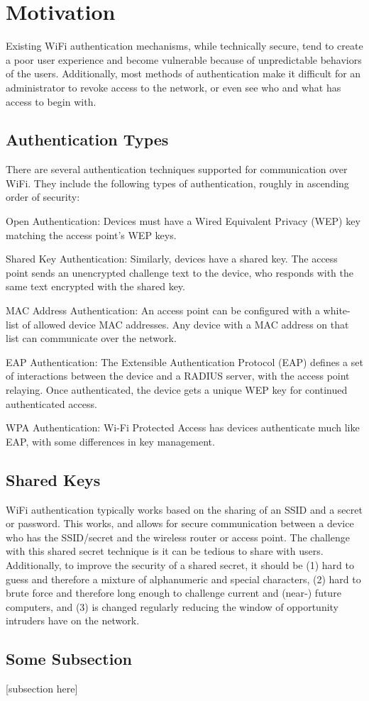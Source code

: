 \section{Motivation}
\label{section:motivation}
Existing WiFi authentication mechanisms, while technically secure, tend to create a poor user
experience and become vulnerable because of unpredictable behaviors of the users. Additionally,
most methods of authentication make it difficult for an administrator to revoke access to the
network, or even see who and what has access to begin with.

\subsection{Authentication Types}
There are several authentication techniques supported for communication over WiFi. They include
the following types of authentication, roughly in ascending order of security: \cite{WifiAuthenticationTypes}
\begin{authTypes}
  \item{Open Authentication:} Devices must have a Wired Equivalent Privacy (WEP) key matching the
  access point's WEP keys.
  \item{Shared Key Authentication:} Similarly, devices have a shared key. The access point sends an
  unencrypted challenge text to the device, who responds with the same text encrypted with the shared key.
  \item{MAC Address Authentication:} An access point can be configured with a white-list of allowed
  device MAC addresses. Any device with a MAC address on that list can communicate over the network.
  \item{EAP Authentication:} The Extensible Authentication Protocol (EAP) defines a set of
  interactions between the device and a RADIUS server, with the access point relaying. Once authenticated,
  the device gets a unique WEP key for continued authenticated access.
  \item{WPA Authentication:} Wi-Fi Protected Access has devices authenticate much like EAP, with
  some differences in key management.
\end{authTypes}

\subsection{Shared Keys}
WiFi authentication typically works based on the sharing of an SSID and a secret or password.
This works, and allows for secure communication between a device who has the SSID/secret and
the wireless router or access point. The challenge with this shared secret technique is it
can be tedious to share with users. Additionally, to improve the security of a shared secret,
it should be (1) hard to guess and therefore a mixture of alphanumeric and special characters,
(2) hard to brute force and therefore long enough to challenge current and (near-) future computers,
and (3) is changed regularly reducing the window of opportunity intruders have on the network.



\subsection{Some Subsection}
[subsection here]
